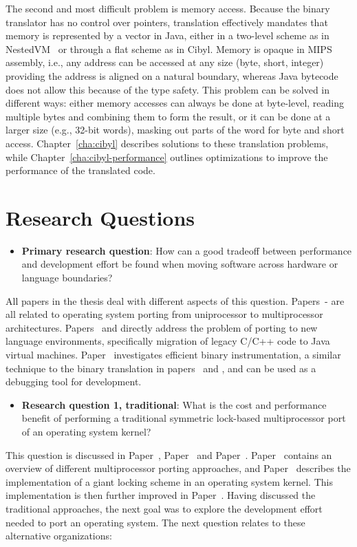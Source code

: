 The second and most difficult problem is memory access. Because the binary
translator has no control over pointers, translation effectively mandates that
memory is represented by a vector in Java, either in a two-level scheme as in
NestedVM~\cite{alliet04nestedvm} or through a flat scheme as in Cibyl. Memory
is opaque in MIPS assembly, i.e., any address can be accessed at any size
(byte, short, integer) providing the address is aligned on a natural boundary,
whereas Java bytecode does not allow this because of the type safety. This
problem can be solved in different ways: either memory accesses can always be
done at byte-level, reading multiple bytes and combining them to form the
result, or it can be done at a larger size (e.g., 32-bit words), masking out
parts of the word for byte and short access. Chapter~\ref{cha:cibyl} describes
solutions to these translation problems, while
Chapter~\ref{cha:cibyl-performance} outlines optimizations to improve the
performance of the translated code.

\section{Research Questions}
\label{sec:intro:research_questions}

\begin{itemize}
\item \textbf{Primary research question}: How can a good tradeoff between
  performance and development effort be found when moving software across
  hardware or language boundaries?
\end{itemize}

All papers in the thesis deal with different aspects of this question.
Papers~- are all related to
operating system porting from uniprocessor to multiprocessor architectures.
Papers~ and  directly address the
problem of porting to new language environments, specifically migration of
legacy C/C++ code to Java virtual machines. Paper~ investigates
efficient binary instrumentation, a similar technique to the binary
translation in papers~ and , and
can be used as a debugging tool for development.

\begin{itemize}
\item \textbf{Research question 1, traditional}: What is the cost and
  performance benefit of performing a traditional symmetric lock-based
  multiprocessor port of an operating system kernel?
\end{itemize}
This question is discussed in Paper~,
Paper~ and Paper~.
Paper~ contains an overview of different multiprocessor
porting approaches, and Paper~ describes the
implementation of a giant locking scheme in an operating system kernel. This
implementation is then further improved in Paper~. Having
discussed the traditional approaches, the next goal was to explore the
development effort needed to port an operating system. The next question
relates to these alternative organizations:

